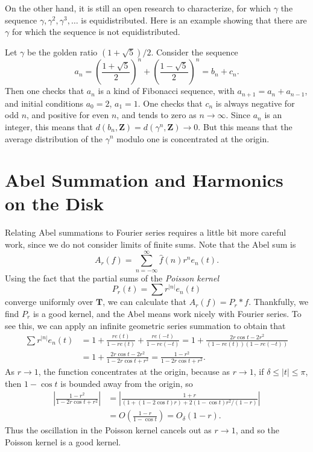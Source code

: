 On the other hand, it is still an open research to characterize, for which $\gamma$ the sequence $\gamma, \gamma^2, \gamma^3, \dots$ is equidistributed. Here is an example showing that there are $\gamma$ for which the sequence is not equidistributed.

\begin{example}
	Let $\gamma$ be the golden ratio $(1 + \sqrt{5})/2$. Consider the sequence
	\[ a_n = \left( \frac{1 + \sqrt{5}}{2} \right)^n + \left( \frac{1 - \sqrt{5}}{2} \right)^n = b_n + c_n. \]
	Then one checks that $a_n$ is a kind of Fibonacci sequence, with $a_{n+1} = a_n + a_{n-1}$, and initial conditions $a_0 = 2$, $a_1 = 1$. One checks that $c_n$ is always negative for odd $n$, and positive for even $n$, and tends to zero as $n \to \infty$. Since $a_n$ is an integer, this means that $d(b_n, \mathbf{Z}) = d(\gamma^n, \mathbf{Z}) \to 0$. But this means that the average distribution of the $\gamma^n$ modulo one is concentrated at the origin.
\end{example}

\section{Abel Summation and Harmonics on the Disk}

Relating Abel summations to Fourier series requires a little bit more careful work, since we do not consider limits of finite sums. Note that the Abel sum is
%
\[ A_r(f) = \sum_{n = -\infty}^\infty \widehat{f}(n) r^n e_n(t). \]
%
Using the fact that the partial sums of the {\it Poisson kernel}
%
\[ P_r(t) = \sum r^{|n|} e_n(t) \]
%
converge uniformly over $\mathbf{T}$, we can calculate that $A_r(f) = P_r * f$. Thankfully, we find $P_r$ is a good kernel, and the Abel means work nicely with Fourier series. To see this, we can apply an infinite geometric series summation to obtain that
%
\begin{align*}
    \sum r^{|n|} e_n(t) &= 1 + \frac{re(t)}{1 - re(t)} + \frac{re(-t)}{1 - re(-t)} = 1 + \frac{2r \cos t - 2r^2}{(1 - re(t))(1 - re(-t))}\\
    &= 1 + \frac{2r \cos t - 2r^2}{1 - 2r \cos t + r^2} = \frac{1 - r^2}{1 - 2r \cos t + r^2}.
\end{align*}
%
As $r \to 1$, the function concentrates at the origin, because as $r \to 1$, if $\delta \leq |t| \leq \pi$, then $1 - \cos t$ is bounded away from the origin, so
%
\begin{align*}
	\left| \frac{1 - r^2}{1 - 2r \cos t + r^2} \right| &= \left| \frac{1 + r}{(1+(1-2\cos t)r) + 2(1 - \cos t) r^2/(1-r)} \right|\\
	&= O \left( \frac{1 - r}{1 - \cos t} \right) = O_\delta(1 - r).
\end{align*}
%
Thus the oscillation in the Poisson kernel cancels out as $r \to 1$, and so the Poisson kernel is a good kernel.

